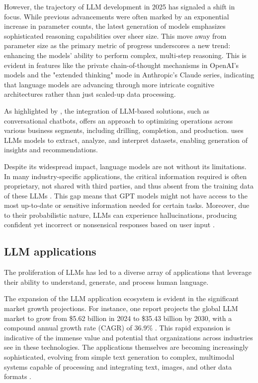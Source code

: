         However, the trajectory of LLM development in 2025 has signaled a shift in focus. While previous advancements were often marked by an exponential increase in parameter counts, the latest generation of models emphasizes sophisticated reasoning capabilities over sheer size. 
        This move away from parameter size as the primary metric of progress underscores a new trend: enhancing the models' ability to perform complex, multi-step reasoning. 
        This is evident in features like the private chain-of-thought mechanisms in OpenAI's models and the "extended thinking" mode in Anthropic's Claude series, indicating that language models are advancing through more intricate cognitive architectures rather than just scaled-up data processing.

        As highlighted by \citet{Singh2023}, the integration of LLM-based solutions, such as conversational chatbots, offers an approach to optimizing operations across various business segments, including drilling, completion, and production.
        \citet{Singh2023} uses LLMs models to extract, analyze, and interpret datasets, enabling generation of insights and recommendations. 

        Despite its widespread impact, language models are not without its limitations. 
        In many industry-specific applications, the critical information required is often proprietary, not shared with third parties, and thus absent from the training data of these LLMs \citep{Mosser2024}. 
        This gap means that GPT models might not have access to the most up-to-date or sensitive information needed for certain tasks. 
        Moreover, due to their probabilistic nature, LLMs can experience hallucinations, producing confident yet incorrect or nonsensical responses based on user input \citep{OpenAI2023}. 
    
    
        \subsection{LLM applications}

            The proliferation of LLMs has led to a diverse array of applications that leverage their ability to understand, generate, and process human language.

            The expansion of the LLM application ecosystem is evident in the significant market growth projections. For instance, one report projects the global LLM market to grow from \$5.62 billion in 2024 to \$35.43 billion by 2030, with a compound annual growth rate (CAGR) of 36.9\% \citep{GrandViewResearch2025}. This rapid expansion is indicative of the immense value and potential that organizations across industries see in these technologies. The applications themselves are becoming increasingly sophisticated, evolving from simple text generation to complex, multimodal systems capable of processing and integrating text, images, and other data formats \citep{Kaddour2023}.
            
